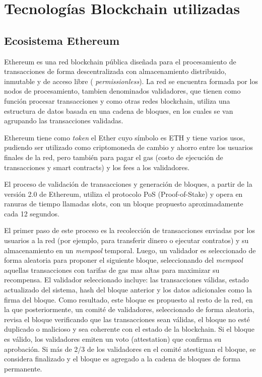 \section{Tecnologías Blockchain utilizadas}


\subsection{Ecosistema Ethereum}

Ethereum \citep{ethereum} es una red blockchain pública diseñada para el procesamiento de transacciones de forma descentralizada con almacenamiento distribuido, inmutable y de acceso libre ( \textit{permissionless}). La red se encuentra formada por los nodos de procesamiento, tambien denominados validadores, que tienen como función procesar transacciones y como otras redes blockchain, utiliza una estructura de datos basada en una cadena de bloques, en los cuales se van agrupando las transacciones validadas. 

Ethereum tiene como \textit{token} el Ether cuyo símbolo es ETH y tiene varios usos, pudiendo ser utilizado como criptomoneda de cambio y ahorro entre los usuarios finales de la red, pero también para pagar el gas (costo de ejecución de transacciones y smart contracts) y los fees a los validadores.

El proceso de validación de transacciones y generación de bloques, a partir de la versión 2.0 de Ethereum, utiliza el protocolo PoS (Proof-of-Stake) \citep{PoS} y opera en ranuras de tiempo llamadas slots, con un bloque propuesto aproximadamente cada 12 segundos. 

El primer paso de este proceso es la recolección de transacciones enviadas por los usuarios a la red (por ejemplo, para transferir dinero o ejecutar contratos) y su almacenamiento en un \textit{mempool} temporal. Luego, un validador es seleccionado de forma aleatoria para proponer el siguiente bloque, seleccionando del \textit{mempool} aquellas transacciones con tarifas de gas mas altas para maximizar su recompensa. El validador seleccionado incluye: las transacciones válidas, estado actualizado del sistema, hash del bloque anterior y los datos adicionales como la firma del bloque. Como resultado, este bloque es propuesto al resto de la red, en la que posteriormente, un comité de validadores, seleccionado de forma aleatoria, revisa el bloque verificando que las transacciones sean válidas, el bloque no esté duplicado o malicioso y sea coherente con el estado de la blockchain. Si el bloque es válido, los validadores emiten un voto (attestation) que confirma su aprobación. Si más de 2/3 de los validadores en el comité atestiguan el bloque, se considera finalizado y el bloque es agregado a la cadena de bloques de forma permanente.

